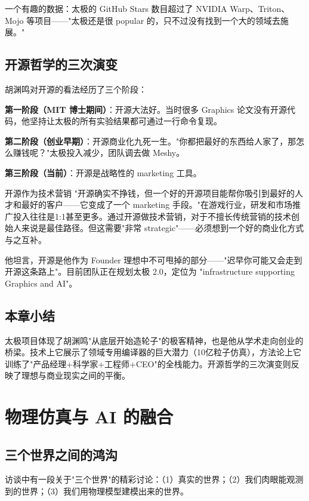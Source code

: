 \documentclass[a4paper]{article}
\begin{document}
一个有趣的数据：太极的 GitHub Stars 数目超过了 NVIDIA Warp、Triton、Mojo 等项目——"太极还是很 popular 的，只不过没有找到一个大的领域去施展。"

\subsection{开源哲学的三次演变}

胡渊鸣对开源的看法经历了三个阶段：

\textbf{第一阶段（MIT 博士期间）}：开源大法好。当时很多 Graphics 论文没有开源代码，他坚持让太极的所有实验结果都可通过一行命令复现。

\textbf{第二阶段（创业早期）}：开源商业化九死一生。"你都把最好的东西给人家了，那怎么赚钱呢？"太极投入减少，团队调去做 Meshy。

\textbf{第三阶段（当前）}：开源是战略性的 marketing 工具。

\begin{importantbox}{开源作为技术营销}
"开源确实不挣钱，但一个好的开源项目能帮你吸引到最好的人才和最好的客户——它变成了一个 marketing 手段。"在游戏行业，研发和市场推广投入往往是1:1甚至更多。通过开源做技术营销，对于不擅长传统营销的技术创始人来说是最佳路径。但这需要"非常 strategic"——必须想到一个好的商业化方式与之互补。
\end{importantbox}

他坦言，开源是他作为 Founder 理想中不可甩掉的部分——"迟早你可能又会走到开源这条路上"。目前团队正在规划太极 2.0，定位为 "infrastructure supporting Graphics and AI"。

\subsection{本章小结}

太极项目体现了胡渊鸣"从底层开始造轮子"的极客精神，也是他从学术走向创业的桥梁。技术上它展示了领域专用编译器的巨大潜力（10亿粒子仿真），方法论上它训练了"产品经理+科学家+工程师+CEO"的全栈能力。开源哲学的三次演变则反映了理想与商业现实之间的平衡。

\section{物理仿真与 AI 的融合}

\subsection{三个世界之间的鸿沟}

访谈中有一段关于"三个世界"的精彩讨论：（1）真实的世界；（2）我们肉眼能观测到的世界；（3）我们用物理模型建模出来的世界。
\end{document}
